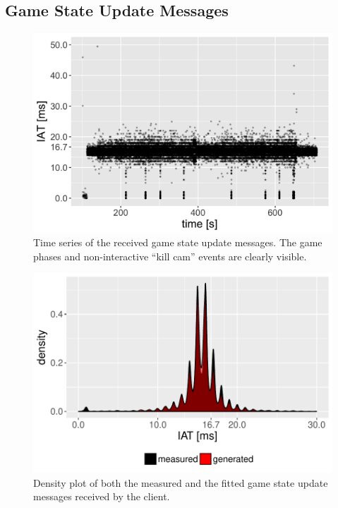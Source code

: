 





\subsection{Game State Update Messages}

	\begin{figure}[t]
		\centering
		\includegraphics[width=1.0\columnwidth]{images/update-ts.png}
		\caption{Time series of the received game state update messages. The game phases and non-interactive ``kill cam'' events are clearly visible.}
	\label{fig:update-timeseries}
	\end{figure}

	\begin{figure}[t]
		\centering
		\includegraphics[width=1.0\columnwidth]{images/update-density.pdf}
		\caption{Density plot of both the measured and the fitted game state update messages received by the client.}
	\label{fig:update-density}
	\end{figure}

